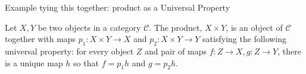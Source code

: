 \documentclass{beamer}
\begin{document}
\begin{frame}[fragile]{Example tying this together: product as a Universal Property}
  \begin{definition}
    Let $X, Y$ be two objects in a category $\mathcal{C}$.  The product, $X\times Y$, is an object of $\mathcal{C}$ together with maps $p_1:X\times Y\to X$ and $p_2:X\times Y\to Y$ satisfying the following universal property: for every object $Z$ and pair of maps $f:Z\to X, g:Z\to Y$, there is a unique map $h$ so that $f=p_1h$ and $g=p_2h$.
  \end{definition}
\begin{center}
\end{center}

\end{frame}
\end{document}
